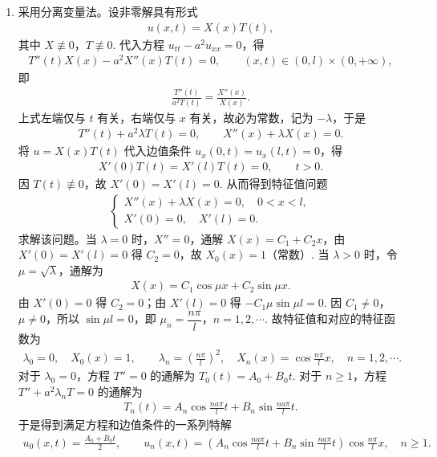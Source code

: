 \documentclass[../../main.tex]{subfiles}%
\begin{document}
\begin{solution}
\begin{enumerate}[(1)]
\item 采用分离变量法。设非零解具有形式
\begin{align*}
u(x,t)=X(x)T(t),
\end{align*}
其中 $X\not\equiv 0$，$T\not\equiv 0$. 代入方程 $u_{tt}-a^2u_{xx}=0$，得
\begin{align*}
T''(t)X(x)-a^2X''(x)T(t)=0,\qquad (x,t)\in(0,l)\times(0,+\infty),
\end{align*}
即
\begin{align*}
\frac{T''(t)}{a^2T(t)}=\frac{X''(x)}{X(x)}.
\end{align*}
上式左端仅与 $t$ 有关，右端仅与 $x$ 有关，故必为常数，记为 $-\lambda$，于是
\begin{align*}
T''(t)+a^2\lambda T(t)=0,\qquad X''(x)+\lambda X(x)=0.
\end{align*}
将 $u=X(x)T(t)$ 代入边值条件 $u_x(0,t)=u_x(l,t)=0$，得
\begin{align*}
X'(0)T(t)=X'(l)T(t)=0,\qquad t>0.
\end{align*}
因 $T(t)\not\equiv 0$，故 $X'(0)=X'(l)=0$. 从而得到特征值问题
\begin{align*}
\begin{cases}
X''(x)+\lambda X(x)=0,\quad 0<x<l,\\
X'(0)=0,\quad X'(l)=0.
\end{cases}
\end{align*}
求解该问题。当 $\lambda=0$ 时，$X''=0$，通解 $X(x)=C_1+C_2x$，由 $X'(0)=X'(l)=0$ 得 $C_2=0$，故 $X_0(x)=1$（常数）.
当 $\lambda>0$ 时，令 $\mu=\sqrt{\lambda}$，通解为
\begin{align*}
X(x)=C_1\cos \mu x+C_2\sin \mu x.
\end{align*}
由 $X'(0)=0$ 得 $C_2=0$；由 $X'(l)=0$ 得 $-C_1\mu\sin \mu l=0$. 因 $C_1\neq 0$，$\mu\neq 0$，所以 $\sin \mu l=0$，即 $\mu_n=\dfrac{n\pi}{l}$，$n=1,2,\cdots$. 故特征值和对应的特征函数为
\begin{align*}
\lambda_0=0,\quad X_0(x)=1,\qquad
\lambda_n=\left(\frac{n\pi}{l}\right)^2,\quad X_n(x)=\cos\frac{n\pi}{l}x,\quad n=1,2,\cdots.
\end{align*}
对于 $\lambda_0=0$，方程 $T''=0$ 的通解为 $T_0(t)=A_0+B_0 t$.
对于 $n\geqslant 1$，方程 $T''+a^2\lambda_n T=0$ 的通解为
\begin{align*}
T_n(t)=A_n\cos\frac{na\pi}{l}t+B_n\sin\frac{na\pi}{l}t.
\end{align*}
于是得到满足方程和边值条件的一系列特解
\begin{align*}
u_0(x,t)=\frac{A_0+B_0t}{2},\qquad
u_n(x,t)=\left(A_n\cos\frac{na\pi}{l}t+B_n\sin\frac{na\pi}{l}t\right)\cos\frac{n\pi}{l}x,\quad n\geqslant 1.

\end{align*}
\end{enumerate}
\end{solution}
\end{document}
